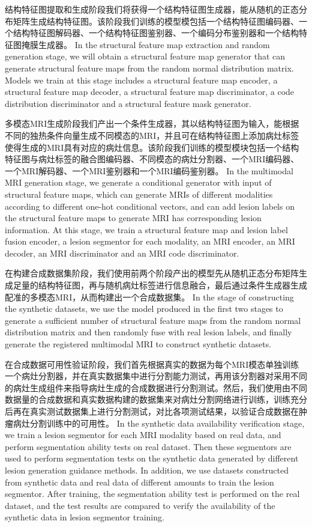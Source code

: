 \documentclass[letterpaper]{article} %
\begin{document}
结构特征图提取和生成阶段我们将获得一个结构特征图生成器，能从随机的正态分布矩阵生成结构特征图。该阶段我们训练的模型模包括一个结构特征图编码器、一个结构特征图解码器、一个结构特征图鉴别器、一个编码分布鉴别器和一个结构特征图掩膜生成器。
In the structural feature map extraction and random generation stage, we will obtain a structural feature map generator that can generate structural feature maps from the random normal distribution matrix. Models we train at this stage includes a structural feature map encoder, a structural feature map decoder, a structural feature map discriminator, a code distribution discriminator and a structural feature mask generator.

多模态MRI生成阶段我们产出一个条件生成器，其以结构特征图为输入，能根据不同的独热条件向量生成不同模态的MRI，并且可在结构特征图上添加病灶标签使得生成的MRI具有对应的病灶信息。该阶段我们训练的模型模块包括一个结构特征图与病灶标签的融合图编码器、不同模态的病灶分割器、一个MRI编码器、一个MRI解码器、一个MRI鉴别器和一个MRI编码鉴别器。
In the multimodal MRI generation stage, we generate a conditional generator with input of structural feature maps, which can generate MRIs of different modalities according to different one-hot conditional vectors, and can add lesion labels on the structural feature maps to generate MRI has corresponding lesion information. At this stage, we train a structural feature map and lesion label fusion encoder, a lesion segmentor for each modality, an MRI encoder, an MRI decoder, an MRI discriminator and an MRI code discriminator.

在构建合成数据集阶段，我们使用前两个阶段产出的模型先从随机正态分布矩阵生成足量的结构特征图，再与随机病灶标签进行信息融合，最后通过条件生成器生成配准的多模态MRI，从而构建出一个合成数据集。
In the stage of constructing the synthetic datasets, we use the model produced in the first two stages to generate a sufficient number of structural feature maps from the random normal distribution matrix and then randomly fuse with real lesion labels, and finally generate the registered multimodal MRI to construct synthetic datasets.

在合成数据可用性验证阶段，我们首先根据真实的数据为每个MRI模态单独训练一个病灶分割器，并在真实数据集中进行分割能力测试，再用该分割器对采用不同的病灶生成组件来指导病灶生成的合成数据进行分割测试。然后，我们使用由不同数据量的合成数据和真实数据构建的数据集来对病灶分割网络进行训练，训练充分后再在真实测试数据集上进行分割测试，对比各项测试结果，以验证合成数据在肿瘤病灶分割训练中的可用性。
In the synthetic data availability verification stage, we train a lesion segmentor for each MRI modality based on real data, and perform segmentation ability tests on real dataset. Then these segmentors are used to perform segmentation tests on the synthetic data generated by different lesion generation guidance methods. In addition, we use datasets constructed from synthetic data and real data of different amounts to train the lesion segmentor. After training, the segmentation ability test is performed on the real dataset, and the test results are compared to verify the availability of the synthetic data in lesion segmentor training.
\end{document}
